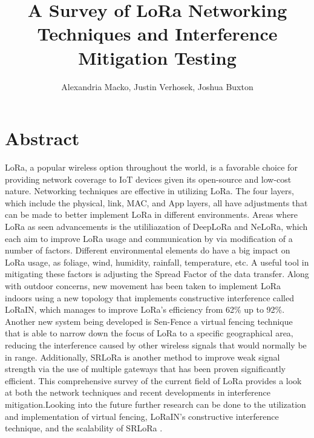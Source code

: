 \documentclass[sigsmall]{acmart}
\title{A Survey of LoRa Networking Techniques and Interference Mitigation Testing}
\author{Alexandria Macko, Justin Verhosek, Joshua Buxton}
\begin{document}
\maketitle
\section*{Abstract}
LoRa, a popular wireless option throughout the world, is a favorable choice for providing network coverage to IoT devices given its open-source and low-cost nature. Networking techniques are effective in utilizing LoRa. The four layers, which include the physical, link, MAC, and App layers, all have adjustments that can be made to better implement LoRa in different environments. Areas where LoRa as seen advancements is the utililiazation of DeepLoRa and NeLoRa, which each aim to improve LoRa usage and communication by via modification of a number of factors. Different environmental elements do have a big impact on LoRa usage, as foliage, wind, humidity, rainfall, temperature, etc. A useful tool in mitigating these factors is adjusting the Spread Factor of the data transfer. Along with outdoor concerns, new movement has been taken to implement LoRa indoors using a new topology that implements constructive interference called LoRaIN, which manages to improve LoRa’s efficiency from 62\% up to 92\%. Another new system being developed is Sen-Fence a virtual fencing technique that is able to narrow down the focus of LoRa to a specific geographical area, reducing the interference caused by other wireless signals that would normally be in range. Additionally, SRLoRa is another method to improve weak signal strength via the use of multiple gateways that has been proven significantly efficient. This comprehensive survey of the current field of LoRa provides a look at both the network techniques and recent developments in interference mitigation.Looking into the future further research can be done to the utilization and implementation of virtual fencing, LoRaIN’s constructive interference technique, and the scalability of SRLoRa \cite{hopper:compilers101}.
\end{document}
